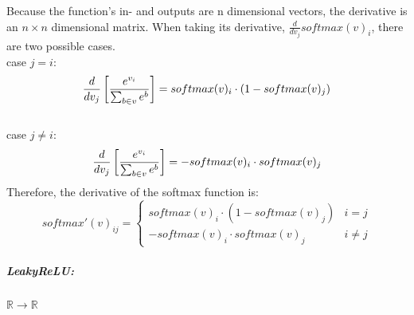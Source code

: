 \documentclass[12pt]{article}
\begin{document}
Because the function's in- and outputs are n dimensional vectors, the derivative is an \(n\times n\) dimensional matrix. When taking its derivative, \(\frac{d}{dv_j}softmax(v)_i\), there are two possible cases. 
\\\indent case \(j = i\):
\begin{equation}
\frac{d}{dv_j}\left[\frac{e^{v_i}}{\sum_{b\in v} e^{b}}\right] = softmax(v)_i\cdot (1 - softmax(v)_j)\\
\end{equation}
\\\indent case \(j \neq i\):
\begin{equation}
\frac{d}{dv_j}\left[\frac{e^{v_i}}{\sum_{b\in v} e^{b}}\right] = -softmax(v)_i\cdot softmax(v)_j \\
\end{equation}
Therefore, the derivative of the softmax function is:
\begin{equation}\label{eq:NN:softmax_derivative}
softmax'(v)_{ij} = \left\{
\begin{array}{ll}
 softmax(v)_i\cdot (1-softmax(v)_j) & i = j\\
 - softmax(v)_i \cdot softmax(v)_j     & i \neq j
\end{array}
\right.
\end{equation}
\subparagraph*{LeakyReLU:}\(\mathbb{R} \to \mathbb{R}\)
\begin{center}

\end{center}
\end{document}
